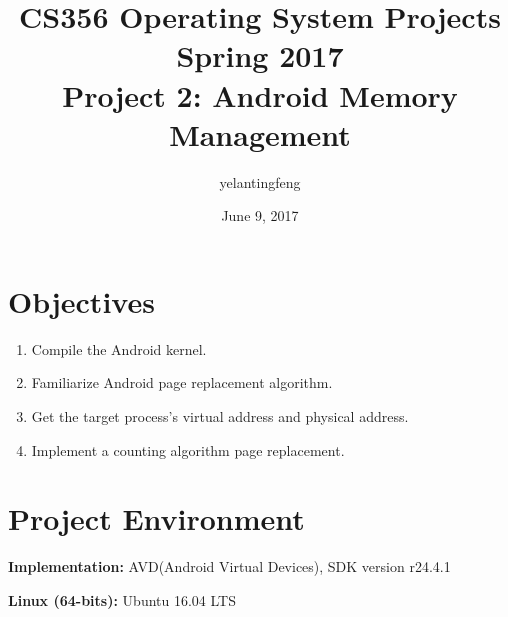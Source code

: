 \documentclass[12pt,a4paper,UTF8]{article}
\newcommand{\mytitle}{\fontsize{15pt}{}\freesans\textbf}
\theoremstyle{definition}
\numberwithin{equation}{section}
\numberwithin{figure}{section}
\begin{document}
\title{\vspace{-0.5cm}\mytitle{CS356} \hspace{2cm}\mytitle{Operating System Projects} \hspace{2cm}\mytitle{Spring 2017}\\\vspace{0.5cm}\mytitle{Project 2: Android Memory Management}}
\author{
  yelantingfeng 
    }
\date{June 9, 2017}
\maketitle
\tableofcontents

\newpage

\section{Objectives}
\begin{enumerate}[ I]
    \item Compile the Android kernel.
    \item Familiarize Android page replacement algorithm.
    \item Get the target process's virtual address and physical address.
    \item Implement a counting algorithm page replacement.
  \end{enumerate}

\section{Project Environment}
\textbf{Implementation:} AVD(Android Virtual Devices), SDK version r24.4.1

\textbf{Linux (64-bits):} Ubuntu 16.04 LTS
\end{document}
